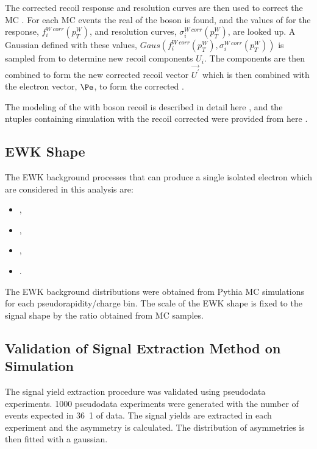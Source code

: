 The corrected recoil response and resolution curves are then used to correct the
\PW \ac{MC} \ETm. For each \PW \ac{MC} events the real \pT of the boson is
found, and the values of for the response, $f^{W\ corr}_i (p^{W}_T)$, and
resolution curves, $\sigma^{W\ corr}_i (p^{W}_T) $, are looked up. A Gaussian
defined with these values, $Gaus(f^{W\ corr}_i (p^{W}_T), \sigma^{W\ corr}_i
(p^{W}_T) )$ is sampled from to determine new recoil components $U_i$. The
components are then combined to form the new corrected recoil vector
$\vec{U^{\prime}}$ which is then combined with the electron vector, $\Pe$, to
form the corrected \ETm.

The modeling of the \HepProcess{\PW\to\Plepton\Pnu} \ETm with boson recoil is
described in detail here \cite{NULL}, and the ntuples containing
\HepProcess{\PW\to\Pelectron\Pnu} simulation with the recoil corrected \ETm were
provided from here \cite{NULL}.

\subsection{\ac{EWK} \ETm Shape}
The EWK background processes that can produce a single isolated
electron which are considered in this analysis are:
\begin{itemize}
\item \HepProcess{\PZ\to\Pelectron\APelectron},
\item \HepProcess{\PZ\to\Ptauon\APtauon},
\item \HepProcess{\PW\to\Ptau\Pnu},
\item \HepProcess{\Ptop\APtop}.
\end{itemize}

The \ac{EWK} background \ETm distributions were obtained from Pythia \ac{MC}
simulations for each pseudorapidity/charge bin.  The scale of the \ac{EWK} shape
is fixed to the signal \ETm shape by the ratio obtained from \ac{MC} samples.

\subsection{Validation of Signal Extraction Method on Simulation}

The signal yield extraction procedure was validated using pseudodata
experiments. 1000 pseudodata experiments were generated with the number of
events expected in \unit{36.1}{\invpb} of data. The signal yields are extracted
in each experiment and the asymmetry is calculated. The distribution of
asymmetries is then fitted with a gaussian.

